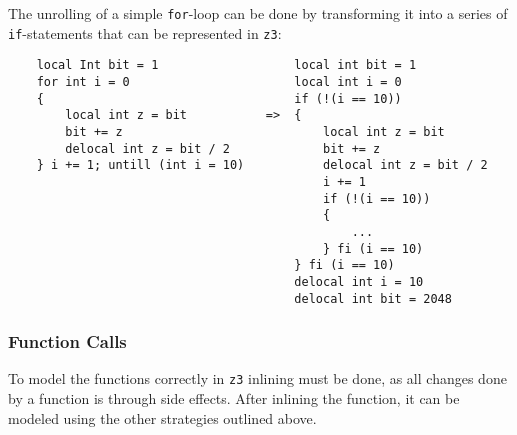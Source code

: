 The unrolling of a simple \texttt{for}-loop can be done by transforming it into a series of
\texttt{if}-statements that can be represented in \texttt{z3}:
\begin{verbatim}
    local Int bit = 1                   local int bit = 1
    for int i = 0                       local int i = 0
    {                                   if (!(i == 10))
        local int z = bit           =>  {
        bit += z                            local int z = bit   
        delocal int z = bit / 2             bit += z
    } i += 1; untill (int i = 10)           delocal int z = bit / 2
                                            i += 1
                                            if (!(i == 10))
                                            {
                                                ...
                                            } fi (i == 10)
                                        } fi (i == 10)
                                        delocal int i = 10
                                        delocal int bit = 2048
\end{verbatim}



\subsubsection*{Function Calls}
To model the functions correctly in \texttt{z3} inlining must be done, as all changes done
by a function is through side effects. After inlining the function, it can be modeled using the
other strategies outlined above.

